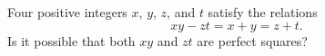 Four positive integers $x$, $y$, $z$, and $t$ satisfy the relations \[xy-zt=x+y=z+t.\] Is it possible that both $xy$ and $zt$ are perfect squares?
